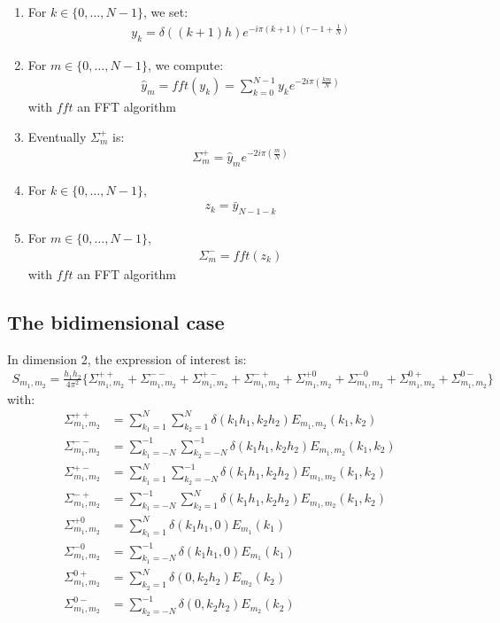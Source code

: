 \begin{enumerate}
\item For $k\in\{0,\hdots,N-1\}$, we set:
\begin{align}
y_{k}=\delta((k+1)h)e^{-i\pi (k+1)\left(\tau-1+\frac{1}{N}\right)}
\end{align}
\item For $m \in\{0,\hdots,N-1\}$, we compute:
\begin{align}
  \widehat{y}_{m}=fft(y_{k})=\sum_{k=0}^{N-1} y_k e^{-2i\pi\left(\frac{k m}{N}\right)} 
\end{align}
with $fft$ an FFT algorithm
\item Eventually $\Sigma_{m}^{+}$ is:
\begin{align*}
  \Sigma_{m}^{+}=\widehat{y}_{m}e^{-2i\pi\left(\frac{m}{N}\right)}
\end{align*}
\item For $k\in\{0,\hdots,N-1\}$,
\begin{align}
z_{k}= \bar{y}_{N-1-k}
\end{align}
\item For $m \in\{0,\hdots,N-1\}$,
\begin{align}
  \Sigma_{m}^{-}=fft(z_{k})
\end{align}
with $fft$ an FFT algorithm
\end{enumerate}

\subsection{The bidimensional case}
In dimension 2, the expression of interest is:
\begin{align}
S_{m_1,m_2}=\frac{h_1h_2}{4\pi^2}\Big\{
  \Sigma_{m_1,m_2}^{++} + \Sigma_{m_1,m_2}^{--} + \Sigma_{m_1,m_2}^{+-} + \Sigma_{m_1,m_2}^{-+} +
  \Sigma_{m_1,m_2}^{+0} + \Sigma_{m_1,m_2}^{-0} + \Sigma_{m_1,m_2}^{0+} + \Sigma_{m_1,m_2}^{0-}
\Big\}
\end{align}
with:
\begin{align}
\Sigma_{m_1,m_2}^{++}&=\sum_{k_1=1}^{N}\sum_{k_2=1}^{N}\delta\left(k_1h_1,k_2h_2\right)E_{m_1,m_2}(k_1,k_2) \label{Eq:sigma++}\\
\Sigma_{m_1,m_2}^{--}&=\sum_{k_1=-N}^{-1}\sum_{k_2=-N}^{-1}\delta\left(k_1h_1,k_2h_2\right)E_{m_1,m_2}(k_1,k_2) \label{Eq:sigma--}\\
\Sigma_{m_1,m_2}^{+-}&=\sum_{k_1=1}^{N}\sum_{k_2=-N}^{-1}\delta\left(k_1h_1,k_2h_2\right)E_{m_1,m_2}(k_1,k_2) \label{Eq:sigma+-}\\
\Sigma_{m_1,m_2}^{-+}&=\sum_{k_1=-N}^{-1}\sum_{k_2=1}^{N}\delta\left(k_1h_1,k_2h_2\right)E_{m_1,m_2}(k_1,k_2) \label{Eq:sigma-+}\\
\Sigma_{m_1,m_2}^{+0}&=\sum_{k_1=1}^{N}\delta(k_1h_1,0)E_{m_1}(k_1) \label{Eq:sigma+0}\\
\Sigma_{m_1,m_2}^{-0}&=\sum_{k_1=-N}^{-1}\delta(k_1h_1,0)E_{m_1}(k_1) \label{Eq:sigma-0}\\
\Sigma_{m_1,m_2}^{0+}&=\sum_{k_2=1}^{N}\delta(0,k_2h_2)E_{m_2}(k_2) \label{Eq:sigma0+}\\
\Sigma_{m_1,m_2}^{0-}&=\sum_{k_2=-N}^{-1}\delta(0,k_2h_2)E_{m_2}(k_2) \label{Eq:sigma0-}
\end{align}

